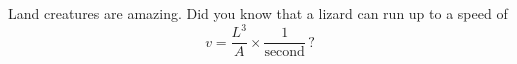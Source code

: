 Land creatures are amazing.
Did you know that a lizard can run up to a speed of
\begin{equation}
  v = \frac{L^3}{A} \times \frac{1}{\text{second}} \, ? \label{lizard_speed} %
\end{equation}
